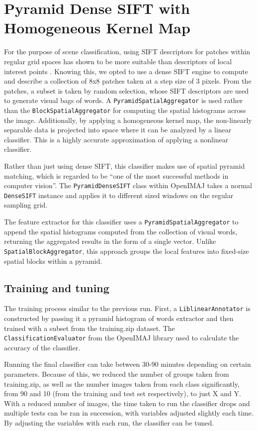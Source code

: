 \documentclass[a4paper]{article}
\begin{document}
\section{Pyramid Dense SIFT with Homogeneous Kernel Map}
For the purpose of scene classification, using SIFT descriptors for patches within regular grid spaces has shown to be more suitable than descriptors of local interest points \cite{lazebnik2006beyond, fei2005bayesian}. Knowing this, we opted to use a dense SIFT engine to compute and describe a collection of 8x8 patches taken at a step size of 3 pixels. From the patches, a subset is taken by random selection, whose SIFT descriptors are used to generate visual bags of words. A \texttt{PyramidSpatialAggregator} is used rather than the \texttt{BlockSpatialAggregator} for computing the spatial histograms across the image. Additionally, by applying a homogeneous kernel map, the non-linearly separable data is projected into space where it can be analyzed by a linear classifier. This is a highly accurate approximation of applying a nonlinear classifier.

Rather than just using dense SIFT, this classifier makes use of spatial pyramid matching, which is regarded to be ``one of the most successful methods in computer vision''\cite{he2014spatial}. The \texttt{PyramidDenseSIFT} class within OpenIMAJ takes a normal \texttt{DenseSIFT} instance and applies it to different sized windows on the regular sampling grid.

The feature extractor for this classifier uses a \texttt{PyramidSpatialAggregator} to append the spatial histograms computed from the collection of visual words, returning the aggregated results in the form of a single vector. Unlike \texttt{SpatialBlockAggregator}, this approach groups the local features into fixed-size spatial blocks within a pyramid.

\subsection{Training and tuning}
The training process similar to the previous run. First, a \texttt{LiblinearAnnotator} is constructed by passing it a pyramid histogram of words extractor and then trained with a subset from the training.zip dataset. The \texttt{ClassificationEvaluator} from the OpenIMAJ library used to calculate the accuracy of the classifier.

Running the final classifier can take between 30-90 minutes depending on certain parameters. Because of this, we reduced the number of groups taken from training.zip, as well as the number images taken from each class significantly, from 90 and 10 (from the training and test set respectively), to just X and Y. With a reduced number of images, the time taken to run the classifier drops and multiple tests can be ran in succession, with variables adjusted slightly each time. By adjusting the variables with each run, the classifier can be tuned.\\
\end{document}
